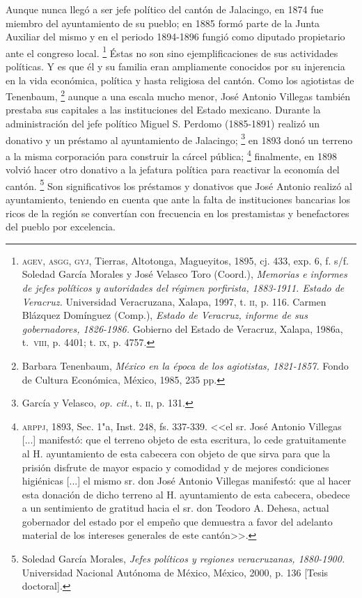 \documentclass[14pt,twoside,final]{extbook} %
\let\oldfootnote\footnote
\renewcommand\footnote[1]{%
\oldfootnote{\hspace{1mm}#1}}
\begin{document}
Aunque nunca llegó a ser jefe político del cantón de Jalacingo, en 1874 fue miembro del ayuntamiento de su pueblo; en 1885 formó parte de la Junta Auxiliar del mismo y en el periodo 1894-1896 fungió como diputado propietario ante el congreso local.\footnote{\textsc{agev, asgg, gyj}, Tierras, Altotonga, Magueyitos, 1895, cj. 433, exp. 6, f. s/f. Soledad García Morales y José Velasco Toro (Coord.), \emph{Memorias e informes de jefes políticos y autoridades del régimen porfirista, 1883-1911. Estado de Veracruz.} Universidad Veracruzana, Xalapa, 1997, t. \textsc{ii}, p. 116. Carmen Blázquez Domínguez (Comp.), \emph{Estado de Veracruz, informe de sus gobernadores, 1826-1986.} Gobierno del Estado de Veracruz, Xalapa, 1986a, t.~\textsc{viii}, p. 4401; t. \textsc{ix}, p. 4757.} Éstas no son sino ejemplificaciones de sus actividades políticas. Y es que él y su familia eran ampliamente conocidos por su injerencia en la vida económica, política y hasta religiosa del cantón. Como los agiotistas de Tenenbaum,\footnote{Barbara Tenenbaum, \emph{México en la época de los agiotistas, 1821-1857.} Fondo de Cultura Económica, México, 1985, 235 pp.} aunque a una escala mucho menor, José Antonio Villegas también prestaba sus capitales a las instituciones del Estado mexicano. Durante la administración del jefe político Miguel S. Perdomo (1885-1891) realizó un donativo y un préstamo al ayuntamiento de Jalacingo;\footnote{García y Velasco, \emph{op. cit.}, t. \textsc{ii}, p. 131.} en 1893 donó un terreno a la misma corporación para construir la cárcel pública;\footnote{\textsc{arppj}, 1893, Sec. 1"a, Inst. 248, fs. 337-339. <<el sr. José Antonio Villegas [...] manifestó: que el terreno objeto de esta escritura, lo cede gratuitamente al H. ayuntamiento de esta cabecera con objeto de que sirva para que la prisión disfrute de mayor espacio y comodidad y de mejores condiciones higiénicas [...] el mismo sr. don José Antonio Villegas manifestó: que al hacer esta donación de dicho terreno al H. ayuntamiento de esta cabecera, obedece a un sentimiento de gratitud hacia el sr. don Teodoro A. Dehesa, actual gobernador del estado por el empeño que demuestra a favor del adelanto material de los intereses generales de este cantón>>.} finalmente, en 1898 volvió hacer otro donativo a la jefatura política para reactivar la economía del cantón.\footnote{Soledad García Morales, \emph{Jefes políticos y regiones veracruzanas, 1880-1900.} Universidad Nacional Autónoma de México, México, 2000, p. 136 [Tesis doctoral].} Son significativos los préstamos y donativos que José Antonio realizó al ayuntamiento, teniendo en cuenta que ante la falta de instituciones bancarias los ricos de la región se convertían con frecuencia en los prestamistas y benefactores del pueblo por excelencia.
\end{document}
